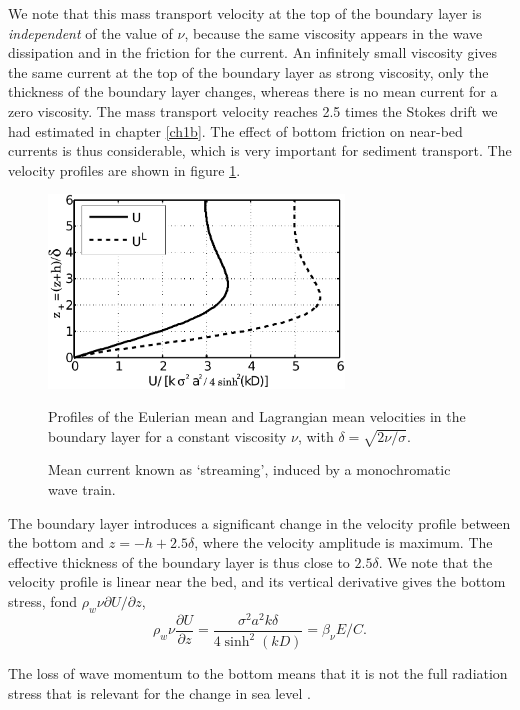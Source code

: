 We note that this mass transport velocity at the top of the boundary layer 
is \emph{independent} of the value of $\nu$, because the same viscosity appears in the 
wave dissipation and in the friction for the current. An infinitely small viscosity gives the 
same current at the top of the boundary layer as strong viscosity, only the thickness of the boundary layer changes, whereas there is no mean current for a zero viscosity.
The mass transport velocity reaches 2.5 times the Stokes drift we had estimated in chapter \ref{ch1b}. The 
effect of bottom friction on near-bed currents is thus considerable, which is very important for sediment transport. The velocity profiles are shown in figure \ref{fig_streaming}. 
\begin{figure}
\centerline{\includegraphics[width=0.7\textwidth]{FIGS_CH_BBL/streaming.pdf}}
  \caption{Mean current known as `streaming', induced by a monochromatic wave train.}{Profiles of the Eulerian mean and Lagrangian mean 
  velocities in the boundary layer for a constant viscosity $\nu$, with $\delta=\sqrt{2 \nu/\sigma}$.}
   \label{fig_streaming}
\end{figure}
The boundary layer introduces a significant change in the velocity profile between the bottom and  $z=-h+2.5 \delta$, where the velocity amplitude is maximum. 
The effective thickness of the boundary layer is thus close to  $2.5 \delta$. We note that the velocity profile is linear near the bed, 
and its vertical derivative gives the bottom stress,  
fond $\rho_w \nu \partial U/\partial z$, 
\begin{equation}
 \rho_w \nu \frac{\partial U}{\partial z} =\frac{\sigma^2 a^2 k \delta}{4 \sinh^2(kD)}=
\beta_{\nu} E /C.
\end{equation}

The loss of wave momentum to the bottom means that it is not the full radiation stress that is relevant for the change in sea level 
\citep{Longuet-Higgins2005,Ardhuin2006b}. 

